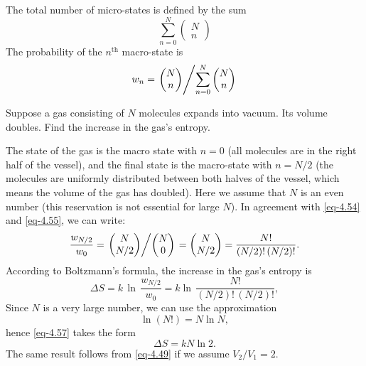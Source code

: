 The total number of micro-states is defined by the sum 
\begin{equation*}
\sum_{n=0}^{N} \begin{pmatrix}
N\\ n
\end{pmatrix}
\end{equation*}
The probability of the $n^{\text{th}}$ macro-state is
\begin{equation}%
w_{n} = \left. \begin{pmatrix}
N\\ n
\end{pmatrix} \middle/ \sum_{n=0}^{N} \begin{pmatrix}
N\\ n
\end{pmatrix} \right.
\label{eq-4.55}
\end{equation}

 Suppose a gas consisting of $N$ molecules expands into vacuum. Its volume doubles. Find the increase in the gas's entropy.

The  state of the gas is the macro state with $n = 0$ (all molecules are in the right half of the vessel), and the final state is the macro-state with $n = N /2$ (the molecules are uniformly distributed	between both halves of the vessel, which means the volume of the gas has doubled). Here we assume that $N$ is an even number (this reservation is not essential for large $N$). In agreement with \eqref{eq-4.54} and \eqref{eq-4.55}, we can write:
\begin{equation}%
\frac{w_{N/2}}{w_{0}} = \left. \begin{pmatrix}
N\\ N/2
\end{pmatrix} \middle/  \begin{pmatrix}
N\\ 0
\end{pmatrix} \right.
= \begin{pmatrix}
N\\ N/2
\end{pmatrix} = \frac{N!}{(N/2)! \, (N/2)!}.
\label{eq-4.56}
\end{equation}
According to Boltzmann's formula, the increase in the gas's entropy is
\begin{equation}%
\Delta S = k \, \ln \,\frac{w_{N/2}}{w_{0}} = k \ln \, \frac{N!}{(N/2)! \, (N/2)!},
\label{eq-4.57}
\end{equation}
Since $N$ is a very large number, we can use the approximation
\begin{equation}%
\ln (N!) = N \ln N,
\label{eq-4.58}
\end{equation}
hence \eqref{eq-4.57} takes the form 
\begin{equation}%
\Delta S = k N \ln 2.
\label{entropy-4}
\end{equation}
The same result follows from \eqref{eq-4.49} if we assume $V_{2} / V_{1} = 2$. 

